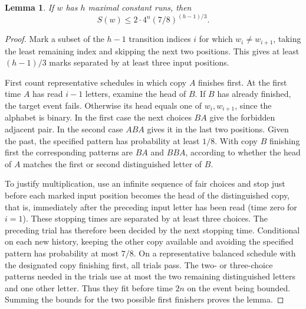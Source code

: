 \documentclass[11pt,letterpaper]{article}
\newtheorem{lemma}[theorem]{Lemma}
\begin{document}
\begin{lemma}\label{many}
If \(w\) has \(h\) maximal constant runs, then
\[
 S(w)\le 2\cdot4^n (7/8)^{(h-1)/3}.
\]
\end{lemma}
\begin{proof}
Mark a subset of the \(h-1\) transition indices \(i\) for which \(w_i\ne w_{i+1}\), taking the least remaining index and skipping the next two positions. This gives at least \((h-1)/3\) marks separated by at least three input positions.

First count representative schedules in which copy \(A\) finishes first. At the first time \(A\) has read \(i-1\) letters, examine the head of \(B\). If \(B\) has already finished, the target event fails. Otherwise its head equals one of \(w_i,w_{i+1}\), since the alphabet is binary. In the first case the next choices \(BA\) give the forbidden adjacent pair. In the second case \(ABA\) gives it in the last two positions. Given the past, the specified pattern has probability at least \(1/8\). With copy \(B\) finishing first the corresponding patterns are \(BA\) and \(BBA\), according to whether the head of \(A\) matches the first or second distinguished letter of \(B\).

To justify multiplication, use an infinite sequence of fair choices and stop just before each marked input position becomes the head of the distinguished copy, that is, immediately after the preceding input letter has been read (time zero for \(i=1\)). These stopping times are separated by at least three choices. The preceding trial has therefore been decided by the next stopping time. Conditional on each new history, keeping the other copy available and avoiding the specified pattern has probability at most \(7/8\). On a representative balanced schedule with the designated copy finishing first, all trials pass. The two- or three-choice patterns needed in the trials use at most the two remaining distinguished letters and one other letter. Thus they fit before time \(2n\) on the event being bounded. Summing the bounds for the two possible first finishers proves the lemma.
\end{proof}
\end{document}
